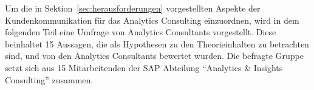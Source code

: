 \documentclass[../main.tex]{subfiles}
\begin{document}
Um die in Sektion~\ref{sec:herausforderungen} vorgestellten Aspekte der Kundenkommunikation für das Analytics Consulting einzuordnen, wird in dem folgenden Teil eine Umfrage von Analytics Consultants vorgestellt.
Diese beinhaltet 15 Aussagen, die als Hypothesen zu den Theorieinhalten zu betrachten sind, und von den Analytics Consultants bewertet wurden.
Die befragte Gruppe setzt sich aus 15 Mitarbeitenden der SAP Abteilung \enquote{Analytics \& Insights Consulting} zusammen.
\end{document}

